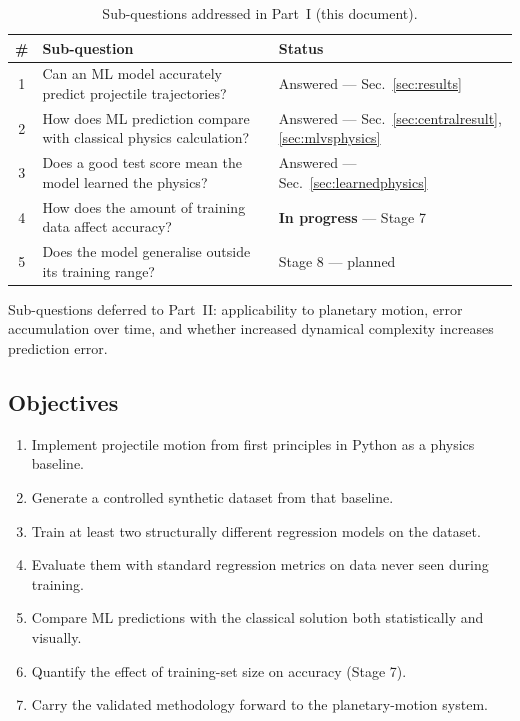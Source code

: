 \documentclass[11pt,a4paper]{article}
\newcommand{\stageprog}{\textbf{In progress}}
\begin{document}
\begin{table}[h]
\centering
\small
\caption{Sub-questions addressed in Part~I (this document).}
\begin{tabular}{@{}clp{5.2cm}@{}}
\toprule
\textbf{\#} & \textbf{Sub-question} & \textbf{Status} \\
\midrule
1 & Can an ML model accurately predict projectile trajectories? & Answered --- Sec.~\ref{sec:results} \\
2 & How does ML prediction compare with classical physics calculation? & Answered --- Sec.~\ref{sec:centralresult}, \ref{sec:mlvsphysics} \\
3 & Does a good test score mean the model learned the physics? & Answered --- Sec.~\ref{sec:learnedphysics} \\
4 & How does the amount of training data affect accuracy? & \stageprog{} --- Stage 7 \\
5 & Does the model generalise outside its training range? & Stage 8 --- planned \\
\bottomrule
\end{tabular}
\end{table}

Sub-questions deferred to Part~II: applicability to planetary motion, error accumulation over time,
and whether increased dynamical complexity increases prediction error.

\subsection{Objectives}

\begin{enumerate}[leftmargin=2em,itemsep=0.1em]
  \item Implement projectile motion from first principles in Python as a physics baseline.
  \item Generate a controlled synthetic dataset from that baseline.
  \item Train at least two structurally different regression models on the dataset.
  \item Evaluate them with standard regression metrics on data never seen during training.
  \item Compare ML predictions with the classical solution both statistically and visually.
  \item Quantify the effect of training-set size on accuracy (Stage 7).
  \item Carry the validated methodology forward to the planetary-motion system.
\end{enumerate}
\end{document}
